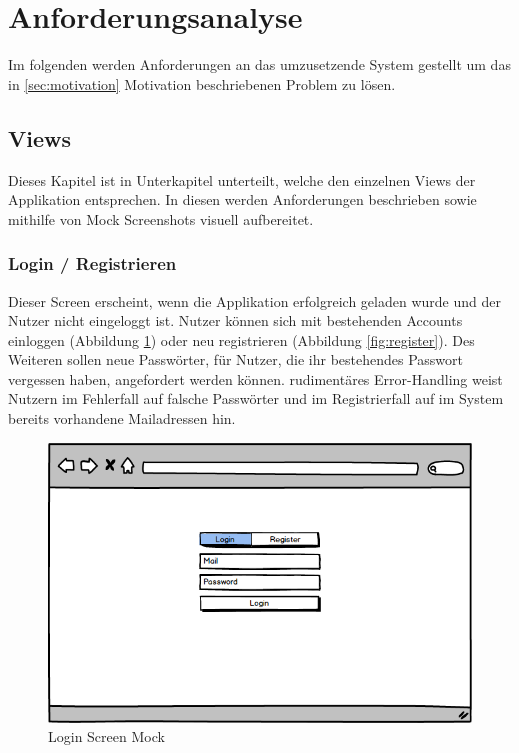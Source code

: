 \section{Anforderungsanalyse}
\label{sec:anforderungsanalyse}

Im folgenden werden Anforderungen an das umzusetzende System gestellt um das in \ref{sec:motivation} Motivation beschriebenen Problem zu lösen.

\subsection{Views}

Dieses Kapitel ist in Unterkapitel unterteilt, welche den einzelnen Views der Applikation \projectname{} entsprechen.
In diesen werden Anforderungen beschrieben sowie mithilfe von Mock Screenshots visuell aufbereitet.

\subsubsection{Login / Registrieren}

Dieser Screen erscheint, wenn die Applikation erfolgreich geladen wurde und der Nutzer nicht eingeloggt ist.
Nutzer können sich mit bestehenden Accounts einloggen (Abbildung \ref{fig:login}) oder neu registrieren (Abbildung \ref{fig:register}).
Des Weiteren sollen neue Passwörter, für Nutzer, die ihr bestehendes Passwort vergessen haben, angefordert werden können.
rudimentäres Error-Handling weist Nutzern im Fehlerfall auf falsche Passwörter und im Registrierfall auf
im System bereits vorhandene Mailadressen hin.

\begin{figure}[h]
 \centering
 \includegraphics[width=0.7\linewidth]{kapitel1/mocks/Login.png}
 \caption{Login Screen Mock}
  \label{fig:login}
\end{figure}

